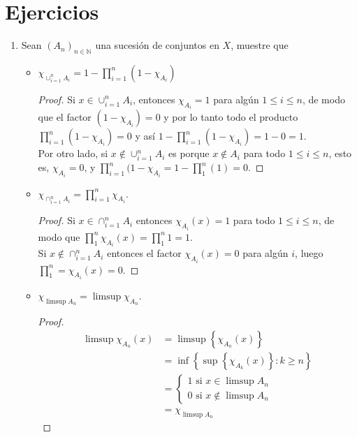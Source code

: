 \documentclass[spanish,12pt,a4paper,openany]{book}
\begin{document}
	\section{Ejercicios} \label{Ejercios 1}
	\begin{enumerate}
		\item Sean $(A_{n})_{n \in \mathbb{N}}$ una sucesión de conjuntos en $X$, muestre que
			\begin{itemize}
				\item $\chi_{\cup_{i=1}^{n} A_{i}} = 1 - \prod_{i=1}^{n}(1- \chi_{A_{i}})$
				\begin{proof}
					Si $ x \in \cup_{i=1}^{n} A_{i} $, entonces $ \chi_{A_{i}} = 1$ para algún $1 \leq i \leq n$, de modo que el factor $(1- \chi_{A_{i}}) = 0$ y por lo tanto todo el producto $ \prod_{i=1}^{n}(1- \chi_{A_{i}}) = 0 $ y así $1 - \prod_{i=1}^{n}(1- \chi_{A_{i}}) = 1 - 0  = 1.$\\
					Por otro lado, si $x \notin \cup_{i=1}^{n} A_{i}$ es porque $x \notin A_{i}$ para todo $1 \leq i \leq n$, esto es, $ \chi_{A_{i}} = 0$, y $\prod_ {i=1}^{n} (1- \chi_{A_{i}} = 1 - \prod_{1}^{n}(1) = 0.$ 		
				\end{proof}
				\item $\chi_{\cap_{i=1}^{n} A_{i}} = \prod_{i=1}^{n}\chi_{A_{i}}$.
				\begin{proof}
					Si $ x \in \cap_{i=1}^{n} A_{i}$ entonces $\chi_{A_{i}} (x) = 1$ para todo $1 \leq i \leq n$, de modo que $\prod_{1}^{n} \chi_{A_{i}} (x) = \prod_{1}^{n} 1 = 1$. \\
					Si $x \notin \cap_{i=1}^{n} A_{i} $ entonces el factor $\chi_{A_{i}}(x)= 0$ para algún $i$, luego $\prod_{1}^{n} = \chi_{A_{i}} (x) = 0$.
				\end{proof}
				\item $\chi_{ \limsup A_{n}} = \limsup\chi_{A_{n}}$.
				\begin{proof}
					\begin{align*}
						\limsup\chi_{A_{n}} (x) &= \limsup \left\{\chi_{A_{n}} (x)\right\} \\
						&= \inf \left\{\sup \left\{\chi_{A_{k}}(x) \right\} : k \geq n \right\}\\
						&= \begin{cases*}
								1 \text{ si } x \in \limsup{A_{n}}\\
								0 \text{ si } x \notin \limsup A_{n} 
							\end{cases*}\\
						&= \chi _{\limsup A_{n}}
					\end{align*}

\end{proof}
\end{itemize}
\end{enumerate}
\end{document}
